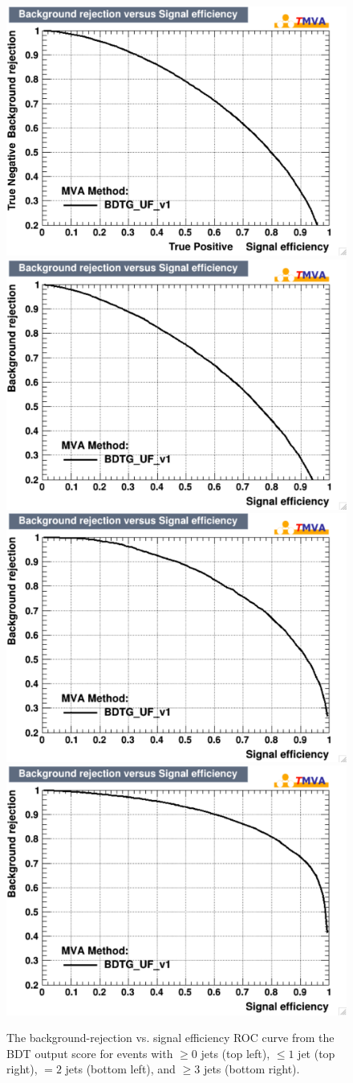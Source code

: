 \begin{figure}
  \includegraphics[width=0.5\linewidth]{figures/bdt_training/BDT_ROC_ge0j_all.pdf}
  \includegraphics[width=0.5\linewidth]{figures/bdt_training/BDT_ROC_le1j_all.pdf}
  \includegraphics[width=0.5\linewidth]{figures/bdt_training/BDT_ROC_eq2j_all.pdf}
  \includegraphics[width=0.5\linewidth]{figures/bdt_training/BDT_ROC_ge3j_all.pdf}
  \caption{The background-rejection vs. signal efficiency ROC curve from the
           BDT output score for events with $\ge 0$ jets (top left), $\le 1$ jet (top right),
           $= 2$ jets (bottom left), and $\ge 3$ jets (bottom right).}
  \label{fig:BDT_ROC}
\end{figure}

